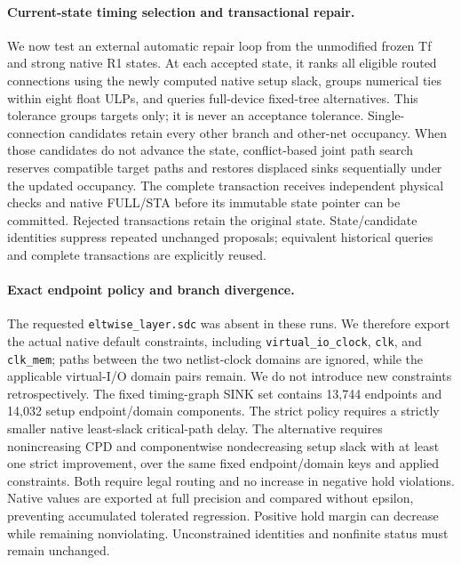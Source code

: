 \paragraph{Current-state timing selection and transactional repair.}
We now test an external automatic repair loop from the unmodified frozen Tf and strong native R1 states. At each accepted state, it ranks all eligible routed connections using the newly computed native setup slack, groups numerical ties within eight float ULPs, and queries full-device fixed-tree alternatives. This tolerance groups targets only; it is never an acceptance tolerance. Single-connection candidates retain every other branch and other-net occupancy. When those candidates do not advance the state, conflict-based joint path search reserves compatible target paths and restores displaced sinks sequentially under the updated occupancy. The complete transaction receives independent physical checks and native FULL/STA before its immutable state pointer can be committed. Rejected transactions retain the original state. State/candidate identities suppress repeated unchanged proposals; equivalent historical queries and complete transactions are explicitly reused.

\paragraph{Exact endpoint policy and branch divergence.}
The requested \texttt{eltwise\_layer.sdc} was absent in these runs. We therefore export the actual native default constraints, including \texttt{virtual\_io\_clock}, \texttt{clk}, and \texttt{clk\_mem}; paths between the two netlist-clock domains are ignored, while the applicable virtual-I/O domain pairs remain. We do not introduce new constraints retrospectively. The fixed timing-graph SINK set contains 13,744 endpoints and 14,032 setup endpoint/domain components. The strict policy requires a strictly smaller native least-slack critical-path delay. The alternative requires nonincreasing CPD and componentwise nondecreasing setup slack with at least one strict improvement, over the same fixed endpoint/domain keys and applied constraints. Both require legal routing and no increase in negative hold violations. Native values are exported at full precision and compared without epsilon, preventing accumulated tolerated regression. Positive hold margin can decrease while remaining nonviolating. Unconstrained identities and nonfinite status must remain unchanged.

